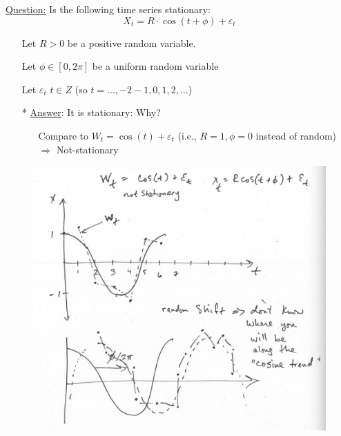 \underline{Question:} Is the following time series stationary:\\
    \[X_t = R \cdot \cos(t+ \phi) + \varepsilon_t\] 
\begin{itemize}
    \item[] Let $R>0$ be a positive random variable.
    \item[] Let $\phi \in [0, 2\pi]$ be a uniform random variable
    \item[] Let $\varepsilon_t$ $t \in Z$ (so $t=...,-2-1,0,1,2,...$)
    \item[*] \underline{Answer}: It is stationary: Why? 
    \begin{itemize}
        \item[] Compare to $W_t = \cos(t)+ \varepsilon_t$ (i.e., $R=1, \phi = 0$ instead of random) $\Rightarrow$ Not-stationary 
    \end{itemize}
\end{itemize}

\begin{figure}[H]
\includegraphics[scale=0.25]{images/Screenshot 2024-04-29 at 08.38.34.jpg}
\centering
\end{figure}

